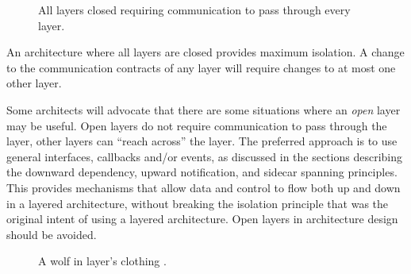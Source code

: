 \begin{figure}[ht]
    \centering
    \caption{All layers closed requiring communication to pass through every layer.}
    \label{fig:closed-layers}
\end{figure}

An architecture where all layers are closed provides maximum isolation.
A change to the communication contracts of any layer will require changes to at most one other layer.

Some architects will advocate that there are some situations where an \textsl{open} layer may be useful.
Open layers do not require communication to pass through the layer, other layers can ``reach across'' the layer.
The preferred approach is to use general interfaces, callbacks and/or events, as discussed in the sections describing
the downward dependency, upward notification, and sidecar spanning principles.
This provides mechanisms that allow data and control to flow both up and down in a layered architecture,
without breaking the isolation principle that was the original intent of using a layered architecture.
Open layers in architecture design should be avoided.

\begin{figure}[ht]
    \centering
    \caption{A wolf in layer's clothing \cite{bass2013software}.}
    \label{fig:wolf}
\end{figure}

